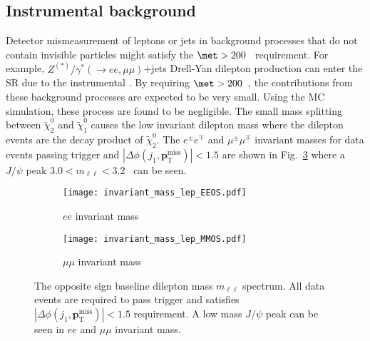 
\subsection{Instrumental \met background}
\label{subsec:bkg_instrumental_met_background}
Detector mismeasurement of leptons or jets in background processes that do not contain invisible particles might satisfy the $\met > 200$~{\GeV} requirement.
For example, $Z^{(*)}/\gamma^{*}(\to ee, \mu \mu)$+jets Drell-Yan dilepton production can enter the SR due to the instrumental \met.
By requiring $\met > 200$~{\GeV}, the contributions from these background processes are expected to be very small.
Using the MC simulation, these process are found to be negligible.
The small mass splitting between $\widetilde{\chi}^{0}_{2}$ and $\widetilde{\chi}^{0}_{1}$ causes the low invariant dilepton mass where the dilepton events are the decay product of $\widetilde{\chi}^{0}_{2}$.
The $e^{\pm} e^{\mp}$ and $\mu^{\pm} \mu^{\mp}$ invariant masses for data events passing \met trigger and $|\Delta \phi(j_{1}, \mathbf{p}_\mathrm{T}^\mathrm{miss})| < 1.5$ are shown in Fig.~\ref{fig:bkg_invariant_mass} where a $J/\psi$ peak $3.0 < m_{\ell \ell} < 3.2$~{\GeV} can be seen.

\begin{figure}[htbp]
    \begin{center}
        \begin{subfigure}[b]{0.48\textwidth}
            \texttt{[image: invariant\_mass\_lep\_EEOS.pdf]}
            \caption{$ee$ invariant mass}
            \label{fig:bkg_ee_invariant_mass}
        \end{subfigure}
        \begin{subfigure}[b]{0.48\textwidth}
            \texttt{[image: invariant\_mass\_lep\_MMOS.pdf]}
            \caption{$\mu \mu$ invariant mass}
            \label{fig:bkg_mumu_invariant_mass}
        \end{subfigure}
        \caption{The opposite sign baseline dilepton mass $m_{\ell \ell}$ spectrum.
        All data events are required to pass \met trigger and satisfies $|\Delta \phi(j_{1}, \mathbf{p}_\mathrm{T}^\mathrm{miss})| < 1.5$ requirement.
        A low mass $J/\psi$ peak can be seen in $ee$ and $\mu \mu$ invariant mass.}
        \label{fig:bkg_invariant_mass}
    \end{center}
\end{figure}


